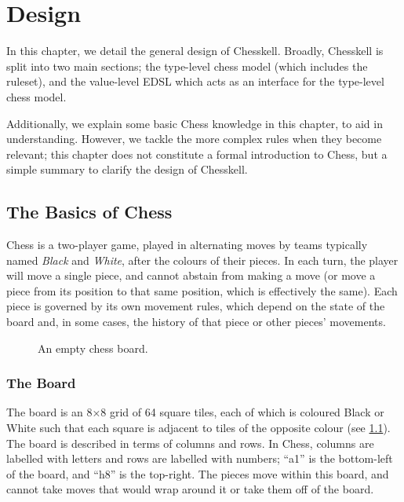 \chapter{Design}

In this chapter, we detail the general design of Chesskell. Broadly, Chesskell is split into two main sections; the type-level chess model (which includes the ruleset), and the value-level EDSL which acts as an interface for the type-level chess model.

Additionally, we explain some basic Chess knowledge in this chapter, to aid in understanding. However, we tackle the more complex rules when they become relevant; this chapter does not constitute a formal introduction to Chess, but a simple summary to clarify the design of Chesskell.

\section{The Basics of Chess}

Chess is a two-player game, played in alternating moves by teams typically named \emph{Black} and \emph{White}, after the colours of their pieces. In each turn, the player will move a single piece, and cannot abstain from making a move (or move a piece from its position to that same position, which is effectively the same). Each piece is governed by its own movement rules, which depend on the state of the board and, in some cases, the history of that piece or other pieces' movements.

\begin{figure}[h]
    \centering
    \showboard
    \caption{An empty chess board.}
    \label{chessboard}
\end{figure}

\subsection{The Board} \label{boarddetails}

The board is an 8×8 grid of 64 square tiles, each of which is coloured Black or White such that each square is adjacent to tiles of the opposite colour (see \cref{chessboard}). The board is described in terms of columns and rows. In Chess, columns are labelled with letters and rows are labelled with numbers; ``a1'' is the bottom-left of the board, and ``h8'' is the top-right. The pieces move within this board, and cannot take moves that would wrap around it or take them off of the board.

